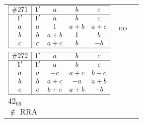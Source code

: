\documentclass[12pt]{article}
\theoremstyle{definition}
\newcommand\RRA{\operatorname{RRA}}
\newcommand\notRRA{\ensuremath{\notin \RRA}}
\newcommand{\join}{\mathbin{+}}%
\newcommand{\id}{{1'}}%
\renewcommand{\top}{1}%
\begin{document}
\begin{center}
\begin{longtable}{l|c|c}
$
\begin{array}{|c|cccc|} \hline
\#271 & \id & a & b & c \\ \hline
\id & \id & a & b & c \\
a & a & \top & a \join b & a \join c \\
b & b & a \join b & \top & b \\
c & c & a \join c & b & -b \\ \hline
\end{array}
$
 & no  
 & \adjustbox{valign=c, max height=1.6cm}{$
\left[ \begin{array}{ccccccc}
\id & a & a & b & c & b & c \\ 
a & \id & a & a & a & b & a \\ 
a & a & \id & b & c & b & c \\ 
b & a & b & \id & b & b & b \\ 
c & a & c & b & \id & b & c \\ 
b & b & b & b & b & \id & b \\ 
c & a & c & b & c & b & \id
\end{array}\right]
$}      \\[15mm]

$
\begin{array}{|c|cccc|} \hline
\#272 & \id & a & b & c \\ \hline
\id & \id & a & b & c \\
a & a & -c & a \join c & b \join c \\
b & b & a \join c & -a & a \join b \\
c & c & b \join c & a \join b & -b \\ \hline
\end{array}
$
 & \begin{tabular}{c} yes \\ $42_{65}$ \\ \notRRA \end{tabular} 
 & \adjustbox{valign=c, max height=1.6cm}{$
\left[ \begin{array}{cccccc}
\id & a & a & b & b & b \\ 
a & \id & a & a & c & c \\ 
a & a & \id & a & c & c \\ 
b & a & a & \id & b & b \\ 
b & c & c & b & \id & c \\ 
b & c & c & b & c & \id
\end{array}\right]
$}      \\[15mm]


\end{longtable}
\end{center}
\end{document}
